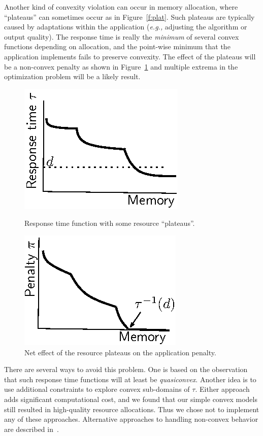 Another kind of convexity violation can occur in memory allocation, where ``plateaus'' can sometimes occur as in Figure~\ref{f:plat}. Such plateaus are typically caused by adaptations within the application (\emph{e.g.,} adjusting the algorithm or output quality).
The response time is really the \emph{minimum} of several convex functions depending on allocation, and the point-wise minimum that the application implements fails to preserve convexity.  The effect of the plateaus will be a non-convex penalty as shown in Figure~\ref{f:plateffect} and multiple extrema in the optimization problem will be a likely result. 



\begin{figure}[hb]
\parbox{1.6in}{
\includegraphics*{Figures/Plateau1.eps}
\caption{\label{f:plat}Response time function with some resource ``plateaus''.}
}
\hspace{\fill}
\parbox{1.6in}{
\includegraphics*{Figures/Plateau2.eps}
\caption{\label{f:plateffect}Net effect of the resource plateaus on the application penalty.}
}
\end{figure}
There are several ways to avoid this problem.  One is based on the observation that such response time functions will at least be \emph{quasiconvex}.  Another idea is to use additional constraints to explore convex sub-domains of $\tau$. Either approach adds significant computational cost, and we found that our simple convex models still resulted in high-quality resource allocations. Thus we chose not to implement any of these approaches.  Alternative approaches to handling non-convex behavior are described in~\cite{pacora_tr}. 

